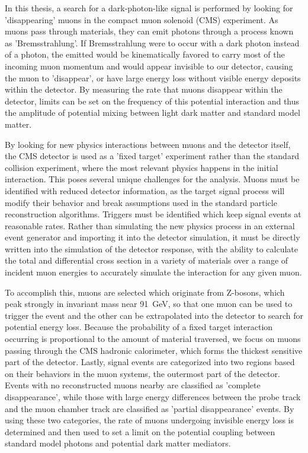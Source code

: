 In this thesis, a search for a dark-photon-like signal is performed by looking for 'disappearing' muons in the compact muon solenoid (CMS) experiment. 
As muons pass through materials, they can emit photons through a process known as 'Bremsstrahlung'. 
If Bremsstrahlung were to occur with a dark photon instead of a photon, the emitted \aprime would be kinematically favored to carry most of the incoming muon momentum and would appear invisible to our detector, causing the muon to 'disappear', or have large energy loss without visible energy deposits within the detector.
By measuring the rate that muons disappear within the detector, limits can be set on the frequency of this potential interaction and thus the amplitude of potential mixing between light dark matter and standard model matter.

By looking for new physics interactions between muons and the detector itself, the CMS detector is used as a 'fixed target' experiment rather than the standard collision experiment, where the most relevant physics happens in the initial interaction.
This poses several unique challenges for the analysis.
Muons must be identified with reduced detector information, as the target signal process will modify their behavior and break assumptions used in the standard particle reconstruction algorithms.
Triggers must be identified which keep signal events at reasonable rates.
Rather than simulating the new physics process in an external event generator and importing it into the detector simulation, it must be directly written into the simulation of the detector response, with the ability to calculate the total and differential cross section in a variety of materials over a range of incident muon energies to accurately simulate the interaction for any given muon.

To accomplish this, muons are selected which originate from Z-bosons, which peak strongly in invariant mass near \SI{91}{\giga\eV}, so that one muon can be used to trigger the event and the other can be extrapolated into the detector to search for potential energy loss.
Because the probability of a fixed target interaction occurring is proportional to the amount of material traversed, we focus on muons passing through the CMS hadronic calorimeter, which forms the thickest sensitive part of the detector.
Lastly, signal events are categorized into two regions based on their behaviors in the muon systems, the outermost part of the detector. 
Events with no reconstructed muons nearby are classified as 'complete disappearance', while those with large energy differences between the probe track and the muon chamber track are classified as 'partial disappearance' events.
By using these two categories, the rate of muons undergoing invisible energy loss is determined and then used to set a limit on the potential coupling between standard model photons and potential dark matter mediators.

